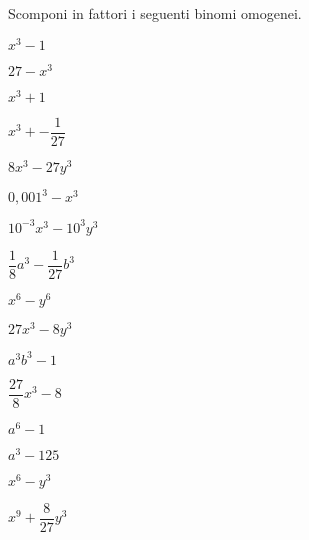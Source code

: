 \begin{esercizio}
\label{ese:17.16}
 Scomponi in fattori i seguenti binomi omogenei.
 \begin{multicols}{4}
 \begin{enumeratea}
 \item $x^{3}-1$
 \item $27-x^{3}$
 \item $x^{3}+1$
 \item $x^{3}+-\dfrac{1}{27}$
 \item $8x^{3}-27y^{3}$
 \item $0,001^{3}-x^{3}$
 \item $10^{-3}x^{3}-10^{3}y^{3}$
 \item $\dfrac{1}{8}a^{3}-\dfrac{1}{27}b^{3}$
 \item $x^{6}-y^{6}$
 \item $27x^{3}-8y^{3}$
 \item $a^{3}b^{3}-1$
 \item $\dfrac{27}{8}x^{3}-8$
 \item $a^{6}-1$
 \item $a^{3}-125$
 \item $x^{6}-y^{3}$
 \item $x^{9}+\dfrac{8}{27}y^{3}$
 \end{enumeratea}
 \end{multicols}
\end{esercizio}


